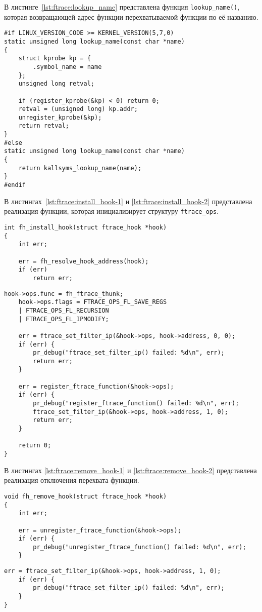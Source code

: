 \clearpage

В листинге~\ref{lst:ftrace:lookup_name} представлена функция \texttt{lookup\_name()}, которая возвращающей адрес функции перехватываемой функции по её названию.

\begin{lstlisting}[label=lst:ftrace:lookup_name,caption=Реализация функции lookup\_name()]
#if LINUX_VERSION_CODE >= KERNEL_VERSION(5,7,0)
static unsigned long lookup_name(const char *name)
{
	struct kprobe kp = {
		.symbol_name = name
	};
	unsigned long retval;
	
	if (register_kprobe(&kp) < 0) return 0;
	retval = (unsigned long) kp.addr;
	unregister_kprobe(&kp);
	return retval;
}
#else
static unsigned long lookup_name(const char *name)
{
	return kallsyms_lookup_name(name);
}
#endif
\end{lstlisting}

В листингах~\ref{lst:ftrace:install_hook-1} и \ref{lst:ftrace:install_hook-2}  представлена реализация функции, которая инициализирует структуру \texttt{ftrace\_ops}.

\begin{lstlisting}[label=lst:ftrace:install_hook-1,caption=Реализация функции install\_hook()]
int fh_install_hook(struct ftrace_hook *hook)
{
	int err;
	
	err = fh_resolve_hook_address(hook);
	if (err)
		return err;
\end{lstlisting}	
\begin{lstlisting}[label=lst:ftrace:install_hook-2,caption=Реализация функции  fn\_install\_hook()]	
	hook->ops.func = fh_ftrace_thunk;
	hook->ops.flags = FTRACE_OPS_FL_SAVE_REGS
	| FTRACE_OPS_FL_RECURSION
	| FTRACE_OPS_FL_IPMODIFY;
	
	err = ftrace_set_filter_ip(&hook->ops, hook->address, 0, 0);
	if (err) {
		pr_debug("ftrace_set_filter_ip() failed: %d\n", err);
		return err;
	}
	
	err = register_ftrace_function(&hook->ops);
	if (err) {
		pr_debug("register_ftrace_function() failed: %d\n", err);
		ftrace_set_filter_ip(&hook->ops, hook->address, 1, 0);
		return err;
	}
	
	return 0;
}
\end{lstlisting}

В листингах \ref{lst:ftrace:remove_hook-1} и \ref{lst:ftrace:remove_hook-2} представлена реализация отключения перехвата функции.

\begin{lstlisting}[label=lst:ftrace:remove_hook-1,caption=Реализация функции fn\_remove\_hook()]
void fh_remove_hook(struct ftrace_hook *hook)
{
	int err;
	
	err = unregister_ftrace_function(&hook->ops);
	if (err) {
		pr_debug("unregister_ftrace_function() failed: %d\n", err);
	}
\end{lstlisting}
\begin{lstlisting}[label=lst:ftrace:remove_hook-2,caption=Реализация функции fn\_remove\_hook()]	
	err = ftrace_set_filter_ip(&hook->ops, hook->address, 1, 0);
	if (err) {
		pr_debug("ftrace_set_filter_ip() failed: %d\n", err);
	}
}
\end{lstlisting}

